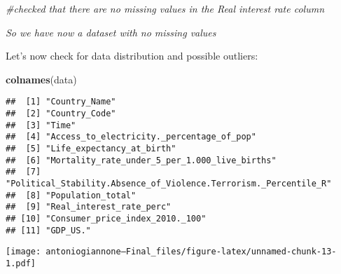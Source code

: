\documentclass[
]{article}
\newenvironment{Shaded}{\begin{snugshade}}{\end{snugshade}}
\newcommand{\AttributeTok}[1]{\textcolor[rgb]{0.13,0.29,0.53}{#1}}
\newcommand{\CommentTok}[1]{\textcolor[rgb]{0.56,0.35,0.01}{\textit{#1}}}
\newcommand{\DecValTok}[1]{\textcolor[rgb]{0.00,0.00,0.81}{#1}}
\newcommand{\FunctionTok}[1]{\textcolor[rgb]{0.13,0.29,0.53}{\textbf{#1}}}
\newcommand{\NormalTok}[1]{#1}
\newcommand{\SpecialCharTok}[1]{\textcolor[rgb]{0.81,0.36,0.00}{\textbf{#1}}}
\newcommand{\StringTok}[1]{\textcolor[rgb]{0.31,0.60,0.02}{#1}}
\begin{document}
\begin{Shaded}
\begin{Highlighting}[]
\CommentTok{\#checked that there are no missing values in the Real interest rate column}
\end{Highlighting}
\end{Shaded}

\emph{So we have now a dataset with no missing values}

Let's now check for data distribution and possible outliers:

\begin{Shaded}
\begin{Highlighting}[]
\FunctionTok{colnames}\NormalTok{(data)}
\end{Highlighting}
\end{Shaded}

\begin{verbatim}
##  [1] "Country_Name"                                                   
##  [2] "Country_Code"                                                   
##  [3] "Time"                                                           
##  [4] "Access_to_electricity._percentage_of_pop"                       
##  [5] "Life_expectancy_at_birth"                                       
##  [6] "Mortality_rate_under_5_per_1.000_live_births"                   
##  [7] "Political_Stability.Absence_of_Violence.Terrorism._Percentile_R"
##  [8] "Population_total"                                               
##  [9] "Real_interest_rate_perc"                                        
## [10] "Consumer_price_index_2010._100"                                 
## [11] "GDP_US."
\end{verbatim}

\begin{Shaded}
\end{Shaded}

\texttt{[image: antoniogiannone---Final\_files/figure-latex/unnamed-chunk-13-1.pdf]}

\begin{Shaded}
\end{Shaded}
\end{document}
